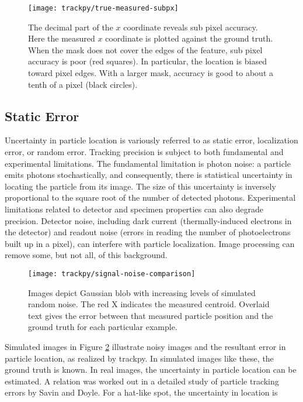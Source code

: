    \begin{figure}
    \centering
    \texttt{[image: trackpy/true-measured-subpx]}
    \caption{\label{fig:true-measured-subpx}The decimal part of the $x$ coordinate reveals sub pixel accuracy. Here the measured $x$ coordinate is plotted against the ground truth. When the mask does not cover the edges of the feature, sub pixel accuracy is poor (red squares). In particular, the location is biased toward pixel edges. With a larger mask, accuracy is good to about a tenth of a pixel (black circles).}
    \end{figure}

\subsection{Static Error}

Uncertainty in particle location is variously referred to as static error, localization error, or random error\cite{Savin2005,Martin2002a,Crocker1996}. Tracking precision is subject to both fundamental and experimental limitations. The fundamental limitation is photon noise: a particle emits photons stochastically, and consequently, there is statistical uncertainty in locating the particle from its image. The size of this uncertainty is inversely proportional to the square root of the number of detected photons\cite{Ober2004}. Experimental limitations related to detector and specimen properties can also degrade precision. Detector noise, including dark current (thermally-induced electrons in the detector) and readout noise (errors in reading the number of photoelectrons built up in a pixel), can interfere with particle localization\cite{Thompson2002,Deschout2012}. Image processing can remove some, but not all, of this background\cite{Deschout2014}.

   \begin{figure}
    \centering
    \texttt{[image: trackpy/signal-noise-comparison]}
    \caption{\label{fig:static-error}Images depict Gaussian blob with increasing levels of simulated random noise. The red X indicates the measured centroid. Overlaid text gives the error between that measured particle position and the ground truth for each particular example.}
    \end{figure}
    
Simulated images in Figure \ref{fig:static-error} illustrate noisy images and the resultant error in particle location, as realized by trackpy. In simulated images like these, the ground truth is known. In real images, the uncertainty in particle location can be estimated. A relation was worked out in a detailed study of particle tracking errors by Savin and Doyle\cite{Savin2005}. For a hat-like spot, the uncertainty in location is

